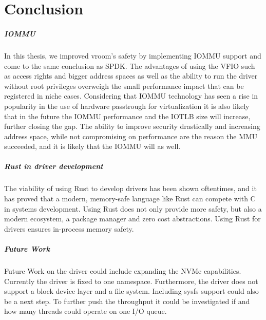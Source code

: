 \chapter{Conclusion}
\paragraph{IOMMU}
In this thesis, we improved vroom's safety by implementing IOMMU support and come to the same conclusion as SPDK. The advantages of using the VFIO such as access rights and bigger address spaces as well as the ability to run the driver without root privileges overweigh the small performance impact that can be registered in niche cases. Considering that IOMMU technology has seen a rise in popularity in the use of hardware passtrough for virtualization it is also likely that in the future the IOMMU performance and the IOTLB size will increase, further closing the gap. The ability to improve security drastically and increasing address space, while not compromising on performance are the reason the MMU succeeded, and it is likely that the IOMMU will as well.

\paragraph{Rust in driver development}
The viability of using Rust to develop drivers has been shown oftentimes, and it has proved that a modern, memory-safe language like Rust can compete with C in systems development. Using Rust does not only provide more safety, but also a modern ecosystem, a package manager and zero cost abstractions. Using Rust for drivers ensures in-process memory safety.

\paragraph{Future Work}
Future Work on the driver could include expanding the NVMe capabilities. Currently the driver is fixed to one namespace. Furthermore, the driver does not support a block device layer and a file system. Including sysfs support could also be a next step.
To further push the throughput it could be investigated if and how many threads could operate on one I/O queue.
